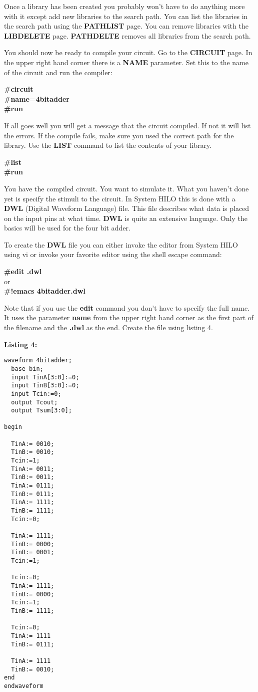   Once a library has been created you probably won't have to do anything
more with it except add new libraries to the search path.  You can list
the libraries in the search path using the {\bf PATHLIST} page.  
You can remove libraries with the {\bf LIBDELETE} page.  
{\bf PATHDELTE} removes all libraries from the search path.

  You should now be ready to compile your circuit.  Go to the {\bf CIRCUIT} 
page.  In the upper right hand corner there is a {\bf NAME} parameter.  
Set this to the name of the circuit and run the compiler:

{\bf   \#circuit}\\
{\bf   \#name=4bitadder}\\
{\bf   \#run}

  If all goes well you will get a message that the circuit compiled.  If 
not it will list the errors.  If the compile fails, make sure you used 
the correct path for the library.  Use the {\bf LIST} command to list the
contents of your library.

{\bf   \#list}\\
{\bf   \#run}

  You have the compiled circuit.  You want to simulate it.  What you
haven't done yet is specify the stimuli to the circuit.  In System
HILO this is done with a {\bf DWL} (Digital Waveform Language) file.  This
file describes what data is placed on the input pins at what time.
{\bf DWL} is quite an extensive language.  Only the basics will be used
for the four bit adder.  

  To create the {\bf DWL} file you can either invoke the editor from System
HILO using vi or invoke your favorite editor using the shell escape
command:

{\bf   \#edit .dwl}\\
    or\\
{\bf   \#!emacs 4bitadder.dwl}

  Note that if you use the {\bf edit} command you don't have to specify 
the full name.  It uses the parameter {\bf name} from the upper right 
hand corner as the first part of the filename and the {\bf .dwl} as the
end.  Create the file using listing 4.

{\bf Listing 4:}

\begin{verbatim}
waveform 4bitadder;
  base bin;
  input TinA[3:0]:=0;
  input TinB[3:0]:=0;
  input Tcin:=0;
  output Tcout;
  output Tsum[3:0];

begin

  TinA:= 0010;
  TinB:= 0010;
  Tcin:=1;
  TinA:= 0011;
  TinB:= 0011;
  TinA:= 0111;
  TinB:= 0111;
  TinA:= 1111;
  TinB:= 1111;
  Tcin:=0;

  TinA:= 1111;
  TinB:= 0000;
  TinB:= 0001;
  Tcin:=1;

  Tcin:=0;
  TinA:= 1111;
  TinB:= 0000;
  Tcin:=1;
  TinB:= 1111;

  Tcin:=0;
  TinA:= 1111
  TinB:= 0111;

  TinA:= 1111
  TinB:= 0010;
end
endwaveform
\end{verbatim}


